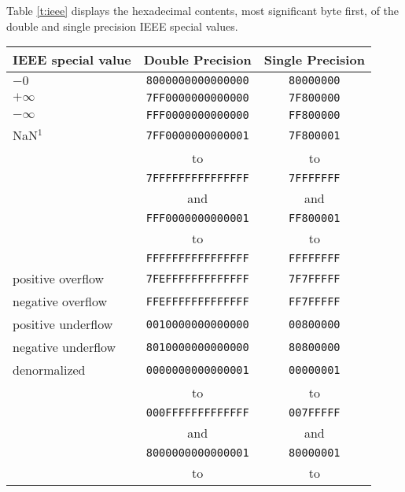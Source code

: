 Table \ref{t:ieee} displays the hexadecimal contents, most significant
byte first, of the double and single precision IEEE special
values.
\begin{table}[htpb]
\begin{center}
\begin{tabular}{lcc} \\
\multicolumn{1}{c}{IEEE special value} & Double Precision & Single Precision \\\hline
    $-0$                & {\tt 8000000000000000} & {\tt 80000000} \\
    $+\infty$           & {\tt 7FF0000000000000} & {\tt 7F800000} \\
    $-\infty$           & {\tt FFF0000000000000} & {\tt FF800000} \\
    NaN$^{1}$           & {\tt 7FF0000000000001} & {\tt 7F800001} \\
                        &             to         &         to     \\
                        & {\tt 7FFFFFFFFFFFFFFF} & {\tt 7FFFFFFF} \\
                        &             and        &         and    \\
                        & {\tt FFF0000000000001} & {\tt FF800001} \\
                        &             to         &         to     \\
                        & {\tt FFFFFFFFFFFFFFFF} & {\tt FFFFFFFF} \\
    positive overflow   & {\tt 7FEFFFFFFFFFFFFF} & {\tt 7F7FFFFF} \\
    negative overflow   & {\tt FFEFFFFFFFFFFFFF} &  {\tt FF7FFFFF} \\
    positive underflow  & {\tt 0010000000000000} & {\tt 00800000} \\
    negative underflow  & {\tt 8010000000000000} & {\tt 80800000} \\
    denormalized        & {\tt 0000000000000001} & {\tt 00000001} \\
                        &             to         &         to     \\
                        & {\tt 000FFFFFFFFFFFFF} & {\tt 007FFFFF} \\
                        &             and        &         and    \\
                        & {\tt 8000000000000001} & {\tt 80000001} \\
                        &             to         &         to     \\

\end{tabular}
\end{center}
\end{table}
